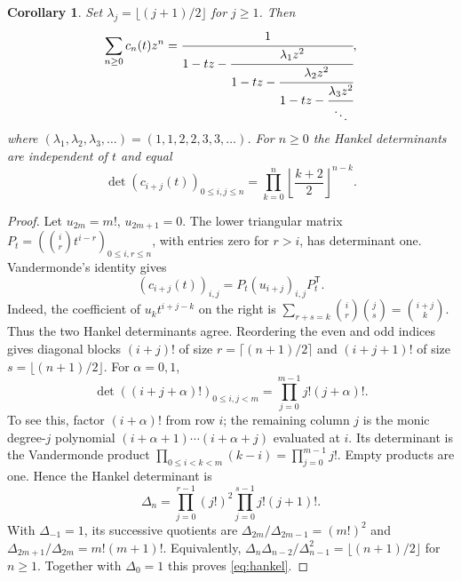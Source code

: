 \documentclass[11pt]{article}
\newtheorem{corollary}{Corollary}
\begin{document}
\begin{corollary}\label{cor:hankel}
Set $\lambda_j=\lfloor(j+1)/2\rfloor$ for $j\geq1$. Then
\begin{equation}\label{eq:jacobi}
 \sum_{n\geq0}c_n(t)z^n
 =\cfrac{1}{1-tz-\cfrac{\lambda_1z^2}{1-tz-
       \cfrac{\lambda_2z^2}{1-tz-\cfrac{\lambda_3z^2}{\ddots}}}},
\end{equation}
where $(\lambda_1,\lambda_2,\lambda_3,\ldots)=(1,1,2,2,3,3,\ldots)$.
For $n\geq0$ the Hankel determinants are independent of $t$ and equal
\begin{equation}\label{eq:hankel}
 \det(c_{i+j}(t))_{0\leq i,j\leq n}
 =\prod_{k=0}^{n}\left\lfloor\frac{k+2}{2}\right\rfloor^{n-k}.
\end{equation}
\end{corollary}
\begin{proof}
Let $u_{2m}=m!$, $u_{2m+1}=0$. The lower triangular matrix
$P_t=(\binom ir t^{i-r})_{0\leq i,r\leq n}$, with entries zero for $r>i$,
has determinant one. Vandermonde's identity gives
\[
 (c_{i+j}(t))_{i,j}=P_t(u_{i+j})_{i,j}P_t^{\mathsf T}.
\]
Indeed, the coefficient of $u_k t^{i+j-k}$ on the right is
$\sum_{r+s=k}\binom ir\binom js=\binom{i+j}k$.
Thus the two Hankel determinants agree. Reordering the even and odd
indices gives diagonal blocks $(i+j)!$ of size
$r=\lceil(n+1)/2\rceil$ and $(i+j+1)!$ of size
$s=\lfloor(n+1)/2\rfloor$. For $\alpha=0,1$,
\[
 \det((i+j+\alpha)!)_{0\leq i,j<m}
 =\prod_{j=0}^{m-1}j!(j+\alpha)!.
\]
To see this, factor $(i+\alpha)!$ from row $i$; the remaining column $j$
is the monic degree-$j$ polynomial
$(i+\alpha+1)\cdots(i+\alpha+j)$ evaluated at $i$.
Its determinant is the Vandermonde product
$\prod_{0\leq i<k<m}(k-i)=\prod_{j=0}^{m-1}j!$.
Empty products are one. Hence the Hankel determinant is
\[
 \Delta_n=\prod_{j=0}^{r-1}(j!)^2\prod_{j=0}^{s-1}j!(j+1)!.
\]
With $\Delta_{-1}=1$, its successive quotients are
$\Delta_{2m}/\Delta_{2m-1}=(m!)^2$ and
$\Delta_{2m+1}/\Delta_{2m}=m!(m+1)!$. Equivalently,
$\Delta_n\Delta_{n-2}/\Delta_{n-1}^2=\lfloor(n+1)/2\rfloor$
for $n\geq1$. Together with $\Delta_0=1$ this proves \eqref{eq:hankel}.


\end{proof}
\end{document}
